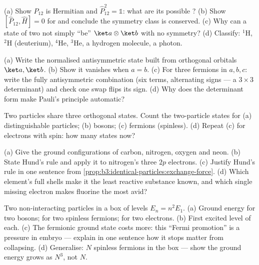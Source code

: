 \begin{exercise}[$\star$]\label{exo:b3:identical-particles:1}
(a) Show $\hat P_{12}$ is Hermitian and $\hat P_{12}^2 = \mathbb 1$:
what are its possible ? (b) Show $[\hat P_{12}, \hat H] =
0$ for  and conclude the symmetry class is
conserved. (c) Why can a state of two  not
simply ``be'' $\ket a\otimes\ket b$ with no symmetry? (d) Classify:
$^1$H, $^2$H (deuterium), $^4$He, $^3$He, a hydrogen molecule, a
photon.
\end{exercise}

\begin{exercise}[$\star$]\label{exo:b3:identical-particles:2}
(a) Write the normalised antisymmetric state built from orthogonal
orbitals $\ket a, \ket b$. (b) Show it vanishes when $a = b$. (c)
For three fermions in $a, b, c$: write the fully antisymmetric
combination (six terms, alternating signs --- a $3\times3$
determinant) and check one swap flips its sign. (d) Why does the
determinant form make Pauli's principle automatic?
\end{exercise}

\begin{exercise}[$\star$]\label{exo:b3:identical-particles:3}
Two particles share three orthogonal states. Count the two-particle
states for (a) distinguishable particles; (b) bosons; (c) fermions
(spinless). (d) Repeat (c) for electrons with spin: how many states
now?
\end{exercise}

\begin{exercise}[$\star$]\label{exo:b3:identical-particles:4}
(a) Give the ground configurations of carbon, nitrogen, oxygen and
neon. (b) State Hund's rule and apply it to nitrogen's three $2p$
electrons. (c) Justify Hund's rule in one sentence from
\cref{prop:b3:identical-particles:exchange-force}. (d) Which
element's full shells make it the least reactive substance known,
and which single missing electron makes fluorine the most avid?
\end{exercise}

\begin{exercise}[$\star\star$]\label{exo:b3:identical-particles:5}
Two non-interacting particles in a box of levels $E_n = n^2E_1$.
(a) Ground energy for two bosons; for two spinless fermions; for
two electrons. (b) First excited level of each. (c) The fermionic
ground state costs more: this ``Fermi promotion'' is a pressure in
embryo --- explain in one sentence how it stops matter from
collapsing. (d) Generalise: $N$ spinless fermions in the box ---
show the ground energy grows as $N^3$, not $N$.
\end{exercise}

